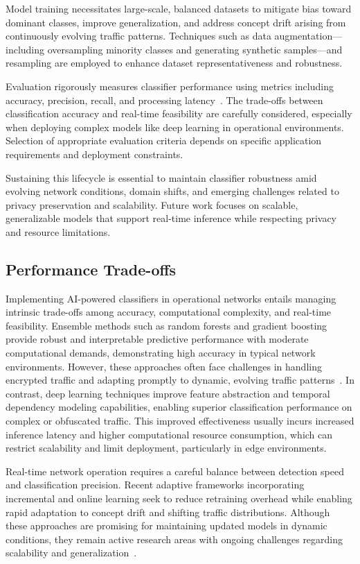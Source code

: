 \documentclass[sigconf]{acmart}
\begin{document}
Model training necessitates large-scale, balanced datasets to mitigate bias toward dominant classes, improve generalization, and address concept drift arising from continuously evolving traffic patterns. Techniques such as data augmentation—including oversampling minority classes and generating synthetic samples—and resampling are employed to enhance dataset representativeness and robustness.

Evaluation rigorously measures classifier performance using metrics including accuracy, precision, recall, and processing latency~\cite{ref51}. The trade-offs between classification accuracy and real-time feasibility are carefully considered, especially when deploying complex models like deep learning in operational environments. Selection of appropriate evaluation criteria depends on specific application requirements and deployment constraints.

Sustaining this lifecycle is essential to maintain classifier robustness amid evolving network conditions, domain shifts, and emerging challenges related to privacy preservation and scalability. Future work focuses on scalable, generalizable models that support real-time inference while respecting privacy and resource limitations.

\subsection{Performance Trade-offs}

Implementing AI-powered classifiers in operational networks entails managing intrinsic trade-offs among accuracy, computational complexity, and real-time feasibility. Ensemble methods such as random forests and gradient boosting provide robust and interpretable predictive performance with moderate computational demands, demonstrating high accuracy in typical network environments. However, these approaches often face challenges in handling encrypted traffic and adapting promptly to dynamic, evolving traffic patterns~\cite{ref51}. In contrast, deep learning techniques improve feature abstraction and temporal dependency modeling capabilities, enabling superior classification performance on complex or obfuscated traffic. This improved effectiveness usually incurs increased inference latency and higher computational resource consumption, which can restrict scalability and limit deployment, particularly in edge environments.

Real-time network operation requires a careful balance between detection speed and classification precision. Recent adaptive frameworks incorporating incremental and online learning seek to reduce retraining overhead while enabling rapid adaptation to concept drift and shifting traffic distributions. Although these approaches are promising for maintaining updated models in dynamic conditions, they remain active research areas with ongoing challenges regarding scalability and generalization~\cite{ref51}.
\end{document}
